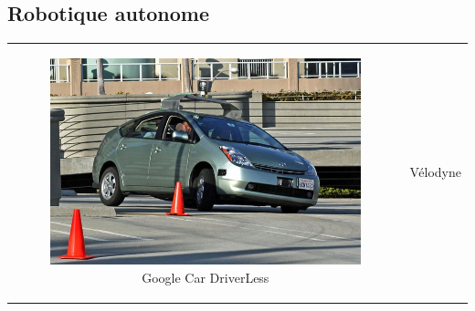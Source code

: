 \documentclass{beamer}
\begin{document}
\subsection*{Robotique autonome}

\begin{frame}
  \begin{tabular}{c c}
    \begin{minipage}{0.5\linewidth}
      \begin{figure}
        \includegraphics[width=1.0\linewidth]{images/GoogleCar.jpg}
        \caption{Google Car DriverLess}
      \end{figure}
    \end{minipage}
    &
    \begin{minipage}{0.5\linewidth}
      Vélodyne
    \end{minipage}
  \end{tabular}
\end{frame}
\end{document}

